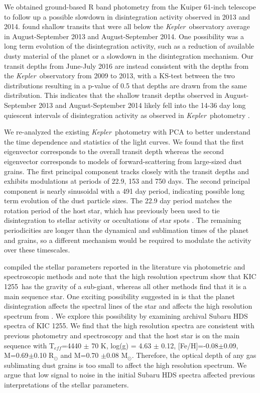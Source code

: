 \documentclass[preprint,trackchanges]{aastex61}
\newcommand{\shStar}{KIC 1255}
\newcommand{\kepler}{{\it Kepler}}
\begin{document}
We obtained ground-based R band photometry from the Kuiper 61-inch telescope to follow up a possible slowdown in disintegration activity observed in 2013 and 2014.
\citet{schlawin2016kic1255} found shallow transits that were all below the \kepler\ observatory average in August-September 2013 and August-September 2014.
One possibility was a long term evolution of the disintegration activity, such as a reduction of available dusty material of the planet or a slowdown in the disintegration mechanism.
Our transit depths from June-July 2016 are instead consistent with the depths from the \kepler\ observatory from 2009 to 2013, with a KS-test between the two distributions resulting in a p-value of 0.5 that depths are drawn from the same distribution.
This indicates that the shallow transit depths observed in August-September 2013 and August-September 2014 likely fell into the 14-36 day long quiescent intervals of disintegration activity as observed in \kepler\ photometry \citep{kawahara2013starspots,vanWerkhoven2014,croll2015starspots}.

We re-analyzed the existing \kepler\ photometry with PCA to better understand the time dependence and statistics of the light curves.
We found that the first eigenvector corresponds to the overall transit depth whereas the second eigenvector corresponds to models of forward-scattering from  large-sized dust grains.
The first principal component tracks closely with the transit depths and exhibits modulations at periods of 22.9, 153 and 750 days.
The second principal component is nearly sinusoidal with a 491 day period, indicating possible long term evolution of the dust particle sizes.
The 22.9 day period matches the rotation period of the host star, which has previously been used to tie disintegration to stellar activity \citep{kawahara2013starspots} or occultations of star spots \citep{croll2015starspots}.
The remaining periodicities are longer than the dynamical and sublimation times of the planet and grains, so a different mechanism would be required to modulate the activity over these timescales.

\citet{vanlieshout2016kic1255} compiled the stellar parameters reported in the literature via photometric and spectroscopic methods and note that the high resolution spectrum show that \shStar\ has the gravity of a sub-giant, whereas all other methods find that it is a main sequence star.
One exciting possibility suggested in \citet{vanlieshout2016kic1255} is that the planet disintegration affects the spectral lines of the star and affects the high resolution spectrum from \citet{kawahara2013starspots}.
We explore this possibility by examining archival Subaru HDS spectra of \shStar.
We find that the high resolution spectra are consistent with previous photometry and spectroscopy and that the host star is on the main sequence with T$_{eff}$=4440 $\pm$ 70 K, log(g) = 4.63 $\pm$ 0.12, [Fe/H]=-0.08$\pm$0.09, M=0.69$\pm$0.10 R$_\odot$ and M=0.70 $\pm$0.08 M$_\odot$.
Therefore, the optical depth of any gas sublimating  dust grains is too small to affect  the high resolution spectrum.
We argue that low signal to noise in the initial Subaru HDS spectra affected previous interpretations of the stellar parameters.
\end{document}
